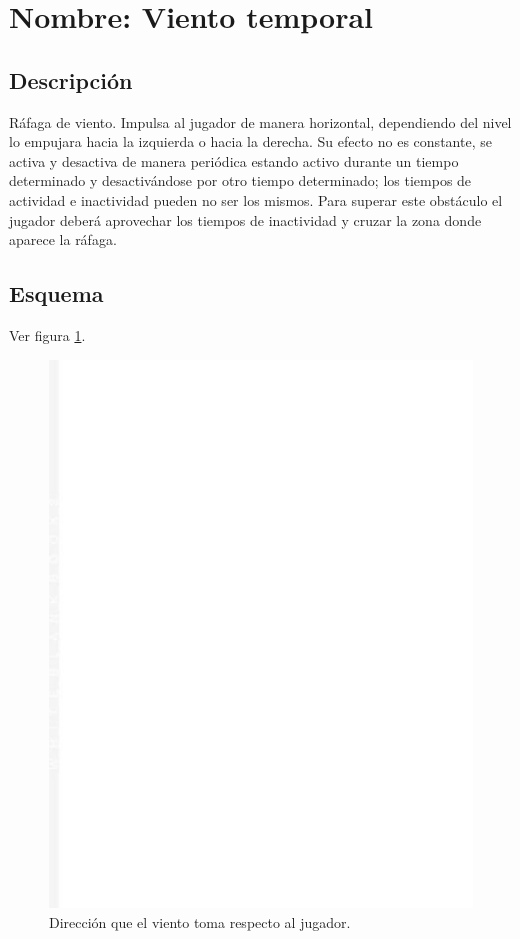 		\section{Nombre: Viento temporal}\label{obs.vientoT}
	\subsection{Descripción}
	Ráfaga de viento. Impulsa al jugador de manera horizontal, dependiendo del nivel lo empujara hacia la izquierda o hacia la derecha. Su efecto no es constante, se activa y desactiva de manera periódica estando activo durante un tiempo determinado y desactivándose por otro tiempo determinado; los tiempos de actividad e inactividad pueden no ser los mismos. Para superar este obstáculo el jugador deberá aprovechar los tiempos de inactividad y cruzar la zona donde aparece la ráfaga.
	\subsection{Esquema}
	Ver figura \ref{fig:vientoT}.
	\begin{figure}
		\centering
		\includegraphics[height=0.2 \textheight]{Imagenes/vientoT}
		\caption{Dirección que el viento toma respecto al jugador.}
		\label{fig:vientoT}
	\end{figure}
